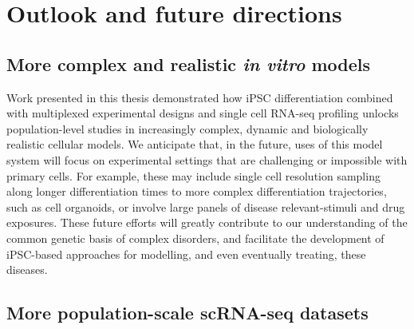 
\section{Outlook and future directions}

\subsection{More complex and realistic \textit{in vitro} models}

Work presented in this thesis demonstrated how iPSC differentiation combined with multiplexed experimental designs and single cell RNA-seq profiling unlocks population-level studies in increasingly complex, dynamic and biologically realistic cellular models. 
We anticipate that, in the future, uses of this model system will focus on experimental settings that are challenging or impossible with primary cells. 
For example, these may include single cell resolution sampling along longer differentiation times to more complex differentiation trajectories, such as cell organoids, or involve large panels of disease relevant-stimuli and drug exposures. 
These future efforts will greatly contribute to our understanding of the common genetic basis of complex disorders, and facilitate the development of iPSC-based approaches for modelling, and even eventually treating, these diseases. 

\subsection{More population-scale scRNA-seq datasets}

